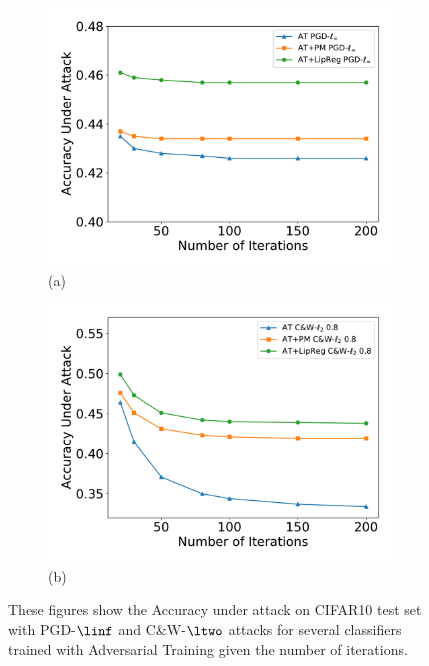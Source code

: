 \begin{figure}[ht]
   \centering
   \begin{subfigure}[b]{0.49\textwidth}
       \centering
       \includegraphics[width=\textwidth]{figures/part2/ch10-lipschitz_bound_adversarial/attacks_iter_pgd.pdf}\\(a)
   \end{subfigure}
   \hfill
   \begin{subfigure}[b]{0.49\textwidth}
       \centering
       \includegraphics[width=\textwidth]{figures/part2/ch10-lipschitz_bound_adversarial/attacks_iter_cw.pdf}\\(b)
   \end{subfigure}
   \caption{These figures show the Accuracy under attack on CIFAR10 test set with PGD-$\linf$ and C\&W-$\ltwo$ attacks for several classifiers trained with Adversarial Training given the number of iterations.}
   \label{figure:attacks_iter}
\end{figure}


